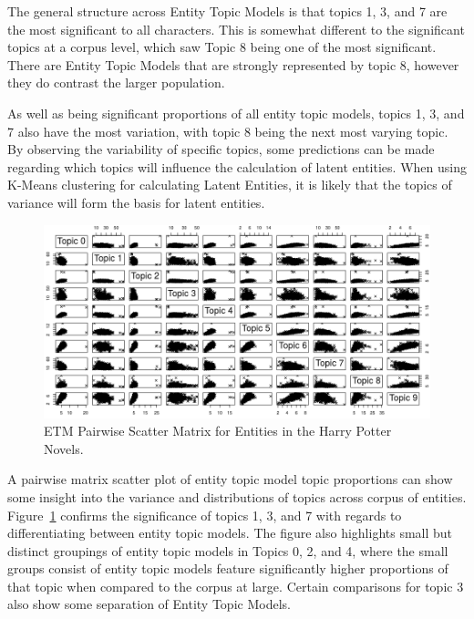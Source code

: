 \documentclass[10pt]{report}
\begin{document}
\begin{multicols}{2}
The general structure across Entity Topic Models is that topics 1, 3, and 7 are the most significant to all characters. This is somewhat different to the significant topics at a corpus level, which saw Topic 8 being one of the most significant. There are Entity Topic Models that are strongly represented by topic 8, however they do contrast the larger population.

As well as being significant proportions of all entity topic models, topics 1, 3, and 7 also have the most variation, with topic 8 being the next most varying topic. By observing the variability of specific topics, some predictions can be made regarding which topics will influence the calculation of latent entities. When using K-Means clustering for calculating Latent Entities, it is likely that the topics of variance will form the basis for latent entities.
\end{multicols}
\clearpage

\renewcommand{\baselinestretch}{1.0}\normalsize
\renewcommand{\arraystretch}{1.0}
\begin{figure}[h!]
  \centering
  \includegraphics[angle=0, scale=0.45]{hp_full_etms}
  \caption{ETM Pairwise Scatter Matrix for Entities in the Harry Potter Novels.\label{fig:hp_etm}}
\end{figure}
\renewcommand{\baselinestretch}{2.0}\normalsize
\renewcommand{\arraystretch}{1.0}
A pairwise matrix scatter plot of entity topic model topic proportions can show some insight into the variance and distributions of topics across corpus of entities. Figure~\ref{fig:hp_etm} confirms the significance of topics 1, 3, and 7 with regards to differentiating between entity topic models. The figure also highlights small but distinct groupings of entity topic models in Topics 0, 2, and 4, where the small groups consist of entity topic models feature significantly higher proportions of that topic when compared to the corpus at large. Certain comparisons for topic 3 also show some separation of Entity Topic Models.
\end{document}
